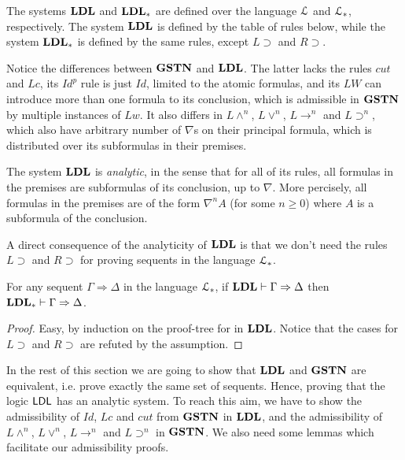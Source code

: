 The systems $\mathbf{LDL}$ and $\mathbf{LDL}_*$ are defined over the language $\mathcal{L}$ and $\mathcal{L}_*$, respectively. The system $\mathbf{LDL}$ is defined by the table of rules below, while the system $\mathbf{LDL}_*$ is defined by the same rules, except $L \supset$ and $R \supset$.


\begin{rem}\label{rem:ldl-gstn}
  Notice the differences between $\mathbf{GSTN}$ and $\mathbf{LDL}$. The latter lacks the rules $cut$ and $Lc$, its $Id ^p$ rule is just $Id$, limited to the atomic formulas, and its $LW$ can introduce more than one formula to its conclusion, which is admissible in $\mathbf{GSTN}$ by multiple instances of $Lw$. It also differs in $L \wedge ^n$, $L \vee ^n$, $L \rightarrow ^n$ and $L \supset ^n$, which also have arbitrary number of $\nabla$s on their principal formula, which is distributed over its subformulas in their premises.  
\end{rem}

\begin{rem}
  The system $\mathbf{LDL}$ is \emph{analytic}, in the sense that for all of its rules, all formulas in the premises are subformulas of its conclusion, up to $\nabla$. More percisely, all formulas in the premises are of the form $\nabla^n A$ (for some $n \geq 0$) where $A$ is a subformula of the conclusion.
\end{rem}

A direct consequence of the analyticity of $\mathbf{LDL}$ is that we don't need the rules $L \supset$ and $R \supset$ for proving sequents in the language $\mathcal{L}_*$.

\begin{thm}\label{thm:ldl-cons-ext}
  For any sequent $\Gamma \Rightarrow \Delta$ in the language $\mathcal{L}_*$, if $\mathbf{LDL} \vdash \Gamma \Rightarrow \Delta$ then $\mathbf{LDL}_* \vdash \Gamma \Rightarrow \Delta$.
\end{thm}
\begin{proof}
  Easy, by induction on the proof-tree for in $\mathbf{LDL}$. Notice that the cases for $L \supset$ and $R \supset$ are refuted by the assumption.
\end{proof}

In the rest of this section we are going to show that $\mathbf{LDL}$ and $\mathbf{GSTN}$ are equivalent, i.e. prove exactly the same set of sequents. Hence, proving that the logic $\mathsf{LDL}$ has an analytic system. To reach this aim, we have to show the admissibility of $Id$, $Lc$ and $cut$ from $\mathbf{GSTN}$ in $\mathbf{LDL}$, and the admissibility of $L \wedge ^n$, $L \vee ^n$, $L \rightarrow ^n$ and $L \supset ^n$ in $\mathbf{GSTN}$. We also need some lemmas which facilitate our admissibility proofs.


